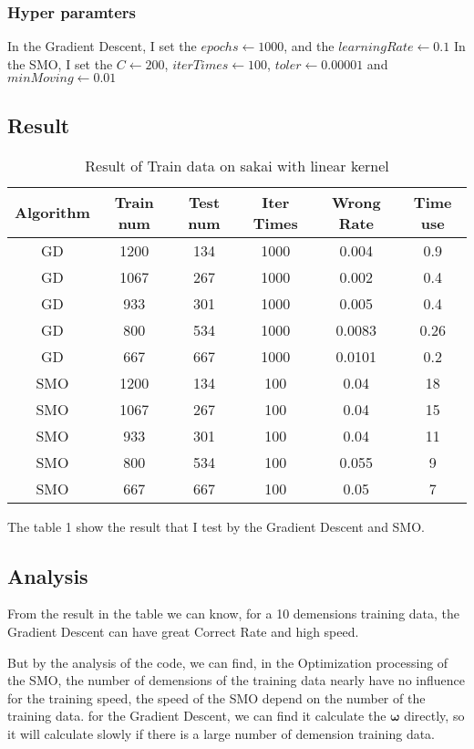\documentclass[conference,compsoc]{IEEEtran}
\begin{document}
	\subsubsection{Hyper paramters}
		In the Gradient Descent, I set the $epochs\gets 1000$, and the $learningRate\gets 0.1$
		In the SMO, I set the $C\gets 200$, $iterTimes\gets 100$, $toler\gets 0.00001$ and $minMoving \gets 0.01$
  \subsection{Result}
	\begin{table}[!htbp]
		\centering
		\caption{Result of Train data on sakai with linear kernel}\label{tab:aStrangeTable}
		\begin{tabular}{|c|c|c|c|c|c|}
		\hline
		\textbf{Algorithm} & \textbf{Train num} & \textbf{Test num} & \textbf{Iter Times} & \textbf{Wrong Rate} & \textbf{Time use}\\
		\hline
		GD	& 1200	& 134	& 1000	& 0.004	& 0.9\\ 
		\hline
		GD	& 1067	& 267	& 1000	& 0.002& 0.4\\
		\hline
		GD	& 933	& 301	& 1000	& 0.005 & 0.4\\
		\hline
		GD 	& 800	& 534	& 1000	& 0.0083& 0.26\\
		\hline
		GD	& 667	& 667	& 1000	& 0.0101& 0.2\\
		\hline
		SMO	& 1200	& 134	& 100	& 0.04	& 18\\ 
		\hline
		SMO	& 1067	& 267	& 100	& 0.04	& 15\\
		\hline
		SMO	& 933	& 301	& 100	& 0.04 & 11\\
		\hline
		SMO	& 800	& 534	& 100	& 0.055	& 9\\
		\hline
		SMO	& 667	& 667	& 100	& 0.05 & 7\\
		\hline
		\end{tabular}
	\end{table}
	The table 1 show the result that I test by the Gradient Descent and SMO.
  \subsection{Analysis}
	From the result in the table we can know, for a 10 demensions training data, the Gradient Descent can have great Correct Rate and high speed.
	
	But by the analysis of the code, we can find, in the Optimization processing of the SMO, the number of demensions of the training data nearly have no influence for the training speed, the speed of the SMO depend on the number of the training data.
	for the  Gradient Descent, we can find it calculate the $\bm{\omega}$ directly, so it will calculate slowly if there is a large number of demension training data.


\end{document}
